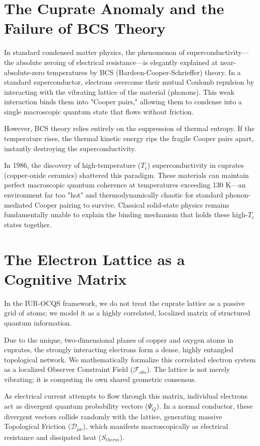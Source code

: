\documentclass[12pt,openany]{book}
\begin{document}
\section{The Cuprate Anomaly and the Failure of BCS Theory}
In standard condensed matter physics, the phenomenon of superconductivity—the absolute zeroing of electrical resistance—is elegantly explained at near-absolute-zero temperatures by BCS (Bardeen-Cooper-Schrieffer) theory. In a standard superconductor, electrons overcome their mutual Coulomb repulsion by interacting with the vibrating lattice of the material (phonons). This weak interaction binds them into "Cooper pairs," allowing them to condense into a single macroscopic quantum state that flows without friction.

However, BCS theory relies entirely on the suppression of thermal entropy. If the temperature rises, the thermal kinetic energy rips the fragile Cooper pairs apart, instantly destroying the superconductivity. 

In 1986, the discovery of high-temperature ($T_c$) superconductivity in cuprates (copper-oxide ceramics) shattered this paradigm. These materials can maintain perfect macroscopic quantum coherence at temperatures exceeding 130 K—an environment far too "hot" and thermodynamically chaotic for standard phonon-mediated Cooper pairing to survive. Classical solid-state physics remains fundamentally unable to explain the binding mechanism that holds these high-$T_c$ states together.

\section{The Electron Lattice as a Cognitive Matrix}
In the IUR-OCQS framework, we do not treat the cuprate lattice as a passive grid of atoms; we model it as a highly correlated, localized matrix of structured quantum information. 

Due to the unique, two-dimensional planes of copper and oxygen atoms in cuprates, the strongly interacting electrons form a dense, highly entangled topological network. We mathematically formalize this correlated electron system as a localized Observer Constraint Field ($\mathcal{F}_{obs}$). The lattice is not merely vibrating; it is computing its own shared geometric consensus.

As electrical current attempts to flow through this matrix, individual electrons act as divergent quantum probability vectors ($\Psi_Q$). In a normal conductor, these divergent vectors collide randomly with the lattice, generating massive Topological Friction ($\mathcal{D}_{\mu\nu}$), which manifests macroscopically as electrical resistance and dissipated heat ($S_{therm}$).
\end{document}
